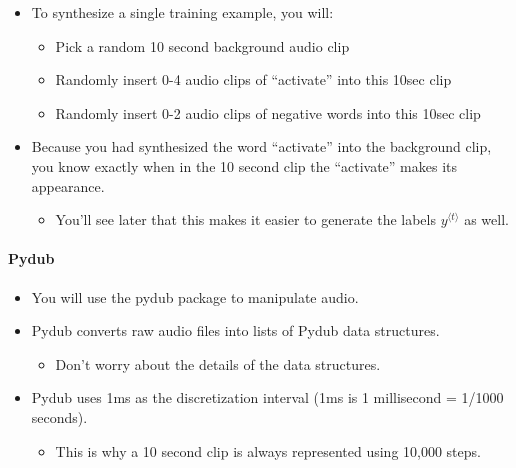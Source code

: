 \documentclass[11pt]{article}
\begin{document}
\begin{itemize}
\itemsep1pt\parskip0pt
\item
  To synthesize a single training example, you will:

  \begin{itemize}
  \itemsep1pt\parskip0pt
  \item
    Pick a random 10 second background audio clip
  \item
    Randomly insert 0-4 audio clips of ``activate'' into this 10sec clip
  \item
    Randomly insert 0-2 audio clips of negative words into this 10sec
    clip
  \end{itemize}
\item
  Because you had synthesized the word ``activate'' into the background
  clip, you know exactly when in the 10 second clip the ``activate''
  makes its appearance.

  \begin{itemize}
  \itemsep1pt\parskip0pt
  \item
    You'll see later that this makes it easier to generate the labels
    $y^{\langle t \rangle}$ as well.
  \end{itemize}
\end{itemize}

\paragraph{Pydub}\label{pydub}

\begin{itemize}
\itemsep1pt\parskip0pt
\item
  You will use the pydub package to manipulate audio.
\item
  Pydub converts raw audio files into lists of Pydub data structures.

  \begin{itemize}
  \itemsep1pt\parskip0pt
  \item
    Don't worry about the details of the data structures.
  \end{itemize}
\item
  Pydub uses 1ms as the discretization interval (1ms is 1 millisecond =
  1/1000 seconds).

  \begin{itemize}
  \itemsep1pt\parskip0pt
  \item
    This is why a 10 second clip is always represented using 10,000
    steps.
  \end{itemize}
\end{itemize}
\end{document}
